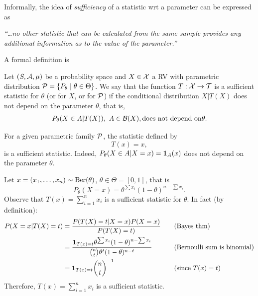 Informally, the idea of \emph{sufficiency} of a statistic wrt a parameter can be expressed as
\begin{displayquote} \it
“…no other statistic that can be calculated from the same sample provides any additional information as to the value of the parameter.”
\end{displayquote}

A formal definition is 
\begin{definition}
\label{def:estadístico_suficiente}
Let $(S,{\mathcal A},\mu)$ be a probability space and  $X\in{\mathcal X}$ a RV with parametric distribution ${\mathcal P} = \{P_\theta \mid \theta\in\Theta\}$. We say that the function $T:{\mathcal X}\rightarrow{\mathcal T}$ is a sufficient statistic for $\theta$ (or for $X$, or for ${\mathcal P}$) if the conditional distribution $X|T(X)$ does not depend on the parameter  $\theta$, that is, 
\begin{align}
\nonumber
	P_\theta(X\in A | T(X)),\ A\in{\mathcal B}(X), \text{does not depend on} \theta.
\end{align} 
\end{definition}


\begin{example}
	\label{ex:suficiencia_trivial}
	For a given parametric family ${\mathcal P}$, the statistic defined by
	\begin{equation}
	\nonumber
		T(x) = x,
	\end{equation}
is a sufficient statistic. Indeed, $P_\theta(X\in A|X=x) = {\mathbf 1}_{A}(x)$ does not depend on the parameter $\theta$. 
\end{example}

\begin{example}
	Let $x=(x_1,\ldots,x_n) \sim \text{Ber}(\theta)$, $\theta \in \Theta = [0,1]$, that is
	\begin{equation}
	\nonumber
		P_\theta(X=x) = \theta^{\sum x_i}(1-\theta)^{n-\sum x_i}.
	\end{equation}
	Observe that $T(x) = \sum\limits_{i=1}^{n} x_i$ is a sufficient statistic for $\theta$. In fact (by definition):  
	\begin{alignat*}{3}
		P(X=x|T(X)=t) 	&= \frac{P(T(X)=t| X=x )P( X=x )}{P(T(X)=t)} \quad&&\text{(Bayes thm)}\\
						&= \frac{{\mathbf 1}_{T(x)=t}\theta^{\sum x_i}(1-\theta)^{n-\sum x_i}}{\binom{n}{t}\theta^t(1-\theta)^{n-t}} &&\text{(Bernoulli sum is binomial)}\\
						&= {\mathbf 1}_{T(x)=t} \binom{n}{t}^{-1} && \text{(since $T(x)=t$)}
	\end{alignat*}
	Therefore, $T(x)=\sum\limits_{i=1}^{n} x_i$ is a sufficient statistic.
\end{example}


